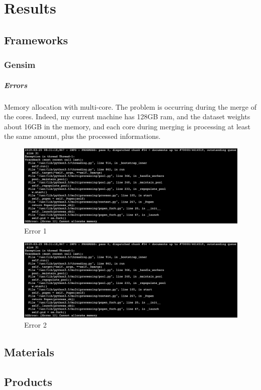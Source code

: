 \chapter{Results}
\label{chap:results}

\section{Frameworks}
\subsection{Gensim} 
\paragraph{Errors} Memory allocation with multi-core. The problem is occurring during the merge of the cores. Indeed, my current machine has 128GB ram, and the dataset weights about 16GB in the memory, and each core during merging is processing at least the same amount, plus the processed informations.\\ 

\begin{figure}[htbp]
\centering
\includegraphics[width=\linewidth]{99-imgs/gensim_memory_allocation_error}
\caption{Error 1}
\label{fig:error-1}
\end{figure}

\begin{figure}[htbp]
\centering
\includegraphics[width=\linewidth]{99-imgs/gensim_memory_allocation_error}
\caption{Error 2}
\label{fig:error-2}
\end{figure}

\section{Materials}

\section{Products}
